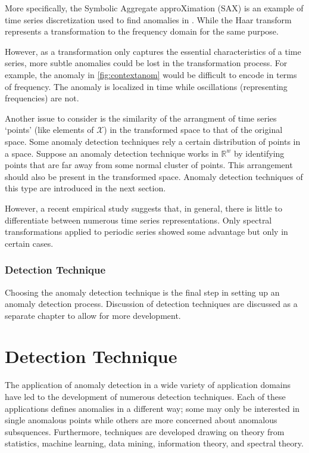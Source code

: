 More specifically, the Symbolic Aggregate approXimation (SAX) \cite{Lin2007} is an example of time series discretization used to find anomalies in  \cite{Keogh2005}. While the Haar transform represents a transformation to the frequency domain \cite{Bu2007,fu2006finding} for the same purpose.

However, as a transformation only captures the essential characteristics of a time series, more subtle anomalies could be lost in the transformation process. For example, the anomaly in \ref{fig:contextanom} would be difficult to encode in terms of frequency. The anomaly is localized in time while oscillations (representing frequencies) are not. 

Another issue to consider is the similarity of the arrangment of time series `points' (like elements of $\mathcal{X}$) in the transformed space to that of the original space. Some anomaly detection techniques rely a certain distribution of points in a space. Suppose an anomaly detection technique works in $\mathbb{R}^w$ by identifying points that are far away from some normal cluster of points. This arrangement should also be present in the transformed space. Anomaly detection techniques of this type are introduced in the next section. %

However, a recent empirical study \cite{Wang2013} suggests that, in general, there is little to differentiate between numerous time series representations. Only spectral transformations applied to periodic series showed some advantage but only in certain cases.

\subsection[adtechnique]{Detection Technique}

Choosing the anomaly detection technique is the final step in setting up an anomaly detection process. Discussion of detection techniques are discussed as a separate chapter to allow for more development.

\chapter[adtechnique]{Detection Technique}

The application of anomaly detection in a wide variety of application domains have led to the development of numerous detection techniques. Each of these applications defines anomalies in a different way;  some  may only be interested in single anomalous points while others are more concerned about anomalous subsquences. Furthermore, techniques are developed drawing on theory from statistics, machine learning, data mining, information theory, and spectral theory.

